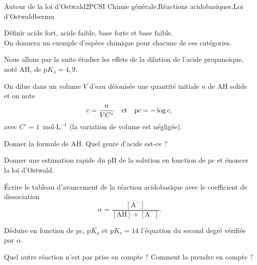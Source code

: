 
\begin{exercise}{Autour de la loi d'Ostwald}{2}{PCSI}
{Chimie générale,Réactions acidobasiques,Loi d'Ostwald}{bermu}

\begin{questions}
\questioncours Définir acide fort, acide faible, base forte et base faible. \\
On donnera un exemple d’espèce chimique pour chacune de ces catégories.

\begin{EnvUplevel}
    Nous allons  par la suite étudier les effets de la dilution de l'acide propanoïque, noté AH, de p$K_\text{a}= 4,9$.

    On dilue dans un volume $V$ d'eau déionisée une quantité initiale $n$ de AH solide et on note
    $$c = \dfrac{n}{V C^\circ} \qqtext{et} \text{p}c = -\log c,$$
    avec $C^\circ = 1$~mol$\cdot\text{L}^{-1}$ (la variation de volume est négligée).
\end{EnvUplevel}
\question Donner la formule de AH. Quel genre d'acide est-ce ?

\question\label{qu:osw} Donner une estimation rapide du pH de la solution en fonction de p$c$ et énoncer la loi d'Ostwald.


\question \'Ecrire le tableau d'avancement de la réaction acidobasique avec le coefficient de dissociation
$$\alpha = \dfrac{\mathrm{[A^-]}}{\mathrm{[AH] + [A^-]}}.$$

\question\label{qu:alpha} Déduire en fonction de p$c$, p$K_\text{a}$ et p$K_\text{e} = 14$ l'équation du second degré vérifiée par $\alpha$.

\question Quel autre réaction n'est pas prise en compte ? Comment la prendre en compte ?


\end{questions}
\end{exercise}
